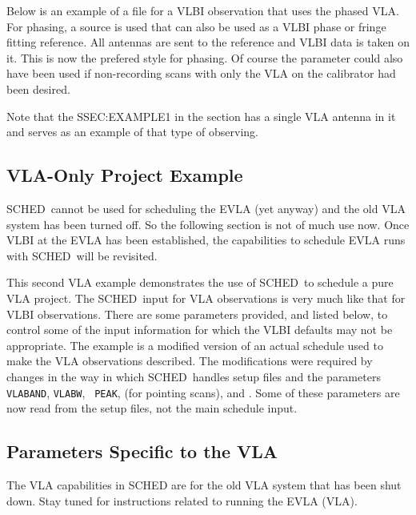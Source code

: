 \documentclass{report}
\newcommand{\schedb}{{\sc SCHED~}}
\begin{document}
Below is an example of a file for a VLBI observation that uses the
phased VLA.  For phasing, a source is used that can also be used as a
VLBI phase or fringe fitting reference.  All antennas are sent to the
reference and VLBI data is taken on it.  This is now the prefered
style for phasing.  Of course the 
parameter could also have been used if non-recording scans with only
the VLA on the calibrator had been desired.

Note that the  {SSEC:EXAMPLE1} in the
 section has a single VLA antenna
in it and serves as an example of that type of observing.


\subsection{\label{SSEC:VLAONLY}VLA-Only Project Example}

\schedb cannot be used for scheduling the EVLA (yet anyway) and the
old VLA system has been turned off.  So the following section is not
of much use now.  Once VLBI at the EVLA has been established, the
capabilities to schedule EVLA runs with \schedb will be revisited.

This second VLA example demonstrates the use of \schedb to schedule a
pure VLA project.  The \schedb input for VLA observations is very much
like that for VLBI observations.  There are some parameters provided,
and listed below, to control some of the input information for which
the VLBI defaults may not be appropriate.  The example is a modified
version of an actual schedule used to make the VLA observations
described.  The modifications were required by changes in the way in
which \schedb handles setup files and the parameters {\tt
VLABAND}, {\tt VLABW}, {\tt
PEAK},  (for pointing
scans), and .  Some of these
parameters are now read from the setup files, not the main schedule
input.



\subsection{\label{SSEC:VLAPAR}Parameters Specific to the VLA}

The VLA capabilities in SCHED are for the old VLA system that has
been shut down.  Stay tuned for instructions related to running
the EVLA (VLA).
\end{document}
